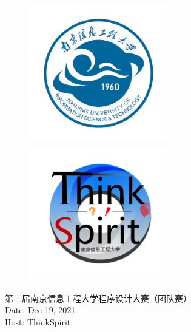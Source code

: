 \begin{titlepage}
    \thispagestyle{empty}
    \begin{figure}[H]
        \centering
        \includegraphics[height=6cm,width=6cm]{src/Logo-NUIST.png}
        \includegraphics[height=6cm,width=6cm]{src/ThinkSpirit.jpg}
    \end{figure}
    {
        \centering
        {\LARGE 第三届南京信息工程大学程序设计大赛（团队赛）} \\
        \vspace{0.5cm}
        {\Large Date: Dec 19, 2021} \\
        \vspace{0.5cm}
        {\Large Host: ThinkSpirit} \\
        \tableofcontents
    }
    \vspace{1cm}
 \end{titlepage}
 \restoregeometry